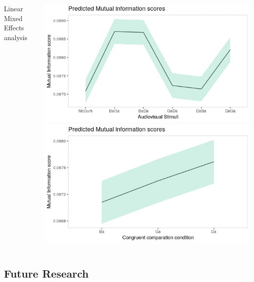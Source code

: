\documentclass{beamer}
\begin{document}
\begin{frame}
\begin{columns}
\begin{center}
\begin{tiny}
Linear Mixed Effects analysis
\end{tiny}
\end{center}
\includegraphics[width=\textwidth]{images/input}
\includegraphics[width=\textwidth]{images/condition}
\end{columns}
\end{frame}

\subsection{Future Research}
\end{document}
